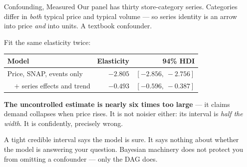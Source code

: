 \documentclass[aspectratio=169, 11pt]{beamer}
\begin{document}
\begin{frame}{Confounding, Measured}
  Our panel has thirty store-category series. Categories differ in \emph{both} typical price and
  typical volume --- so series identity is an arrow into price \emph{and} into units. A textbook
  confounder.

  \vspace{0.1cm}
  Fit the same elasticity twice:
  \begin{center}
    {\small
    \begin{tabular}{lrr}
      \toprule
      \textbf{Model} & \textbf{Elasticity} & \textbf{94\% HDI} \\
      \midrule
      Price, SNAP, events only & $-2.805$ & $[-2.856,\ -2.756]$ \\
      \ \ $+$ series effects and trend & $\mathbf{-0.493}$ & $[-0.596,\ -0.387]$ \\
      \bottomrule
    \end{tabular}
    }
  \end{center}

  \vspace{-0.05cm}
  \textbf{The uncontrolled estimate is nearly six times too large} --- it claims demand collapses
  when price rises. It is not noisier either: its interval is \emph{half the width}. It is
  confidently, precisely wrong.

  \begin{warningbox}
    A tight credible interval says the model is sure. It says nothing about whether the model is
    answering your question. Bayesian machinery does not protect you from omitting a confounder
    --- only the DAG does.
  \end{warningbox}
\end{frame}
\end{document}
